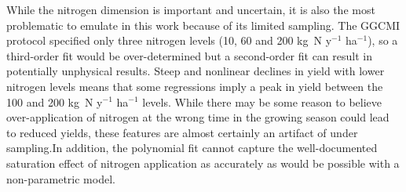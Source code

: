 \documentclass[preprint, 5p, times, twocolumn]{elsarticle}
\begin{document}
While the nitrogen dimension is important and uncertain, it is also the most problematic to emulate in this work because of its limited sampling. The GGCMI protocol specified only three nitrogen levels (10, 60 and 200 kg~N y$^{-1}$ ha$^{-1}$), so a third-order fit would be over-determined but a second-order fit can result in potentially unphysical results. Steep and nonlinear declines in yield with lower nitrogen levels means that some regressions imply a peak in yield between the 100 and 200 kg~N y$^{-1}$ ha$^{-1}$ levels. While there may be some reason to believe over-application of nitrogen at the wrong time in the growing season could lead to reduced yields, these features are almost certainly an artifact of under sampling.In addition, the polynomial fit cannot capture the well-documented saturation effect of nitrogen application \citep[e.g.][]{Torsten77} as accurately as would be possible with a non-parametric model. 
\end{document}
